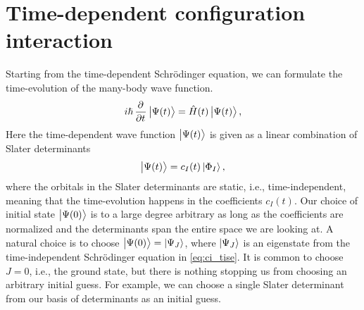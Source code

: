     \section{Time-dependent configuration interaction}
        Starting from the time-dependent Schrödinger equation, we can formulate
        the time-evolution of the many-body wave function.
        \begin{align}
            i\hslash \dpd[]{}{t}\ket{\Psi(t)}
            = \hamil(t)\ket{\Psi(t)},
            \label{eq:ci_tdse}
        \end{align}
        Here the time-dependent wave function $\ket{\Psi(t)}$ is given as a
        linear combination of Slater determinants
        \begin{align}
            \ket{\Psi(t)} = c_{I}(t) \ket{\Phi_I},
            \label{eq:ci_td_wave}
        \end{align}
        where the orbitals in the Slater determinants are static, i.e.,
        time-independent, meaning that the time-evolution happens in the
        coefficients $c_{I}(t)$.
        Our choice of initial state $\ket{\Psi(0)}$ is to a large degree
        arbitrary as long as the coefficients are normalized and the
        determinants span the entire space we are looking at.
        A natural choice is to choose $\ket{\Psi(0)} = \ket{\Psi_J}$, where
        $\ket{\Psi_J}$ is an eigenstate from the time-independent Schrödinger
        equation in \autoref{eq:ci_tise}.
        It is common to choose $J = 0$, i.e., the ground state, but there is
        nothing stopping us from choosing an arbitrary initial guess.
        For example, we can choose a single Slater determinant from our basis of
        determinants as an initial guess.

